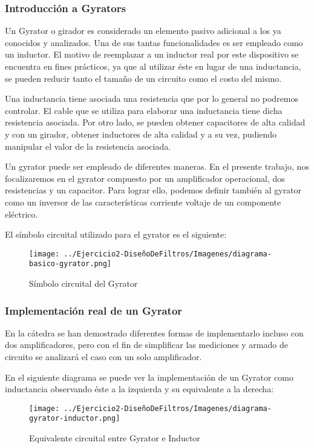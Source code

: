 \subsubsection{Introducción a Gyrators}

Un Gyrator o girador es considerado un elemento pasivo adicional a los ya conocidos y analizados. Una de sus tantas funcionalidades es ser empleado como un inductor. 
El motivo de reemplazar a un inductor real por este dispositivo se encuentra en fines prácticos, ya que al utilizar éste en lugar de una inductancia, se pueden reducir 
tanto el tamaño de un circuito como el costo del mismo. 

Una inductancia tiene asociada una resistencia que por lo general no podremos controlar. El cable que se utiliza para elaborar una inductancia tiene dicha resistencia asociada. 
Por otro lado, se pueden obtener capacitores de alta calidad y con un girador, obtener inductores de alta calidad y a su vez, pudiendo manipular el valor de la resistencia asociada.

Un gyrator puede ser empleado de diferentes maneras. En el presente trabajo, nos focalizaremos en el gyrator compuesto por un amplificador operacional, dos resistencias y un capacitor.
Para lograr ello, podemos definir también al gyrator como un inversor de las características corriente voltaje de un componente eléctrico.

El símbolo circuital utilizado para el gyrator es el siguiente:

\begin{figure}[H]
    \centering
    \texttt{[image: ../Ejercicio2-DiseñoDeFiltros/Imagenes/diagrama-basico-gyrator.png]}
    \caption{Símbolo circuital del Gyrator}
\end{figure}

\subsubsection{Implementación real de un Gyrator}

En la cátedra se han demostrado diferentes formas de implementarlo incluso con dos amplificadores, pero con el fin de simplificar las mediciones
y armado de circuito se analizará el caso con un solo amplificador.

En el siguiente diagrama se puede ver la implementación de un Gyrator como inductancia observando éste a la izquierda y su equivalente a la derecha:

\begin{figure}[H]
    \centering
    \texttt{[image: ../Ejercicio2-DiseñoDeFiltros/Imagenes/diagrama-gyrator-inductor.png]}
    \caption{Equivalente circuital entre Gyrator e Inductor}
\end{figure}

